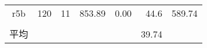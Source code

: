 \begin{table}[]
\begin{tabular}{cccrrrr}
r5b                  & 120                  & 11                   & 853.89                  & 0.00                       & 44.6                        & 589.74                      \\
\multicolumn{1}{l}{} & \multicolumn{1}{l}{} & \multicolumn{1}{l}{} & \multicolumn{1}{l}{}    & \multicolumn{1}{l}{}       & \multicolumn{1}{l}{}        & \multicolumn{1}{l}{}        \\
平均                   & \multicolumn{1}{l}{} & \multicolumn{1}{l}{} & \multicolumn{1}{l}{}    & \multicolumn{1}{l}{}       & 39.74                       & \multicolumn{1}{l}{}        \\ \hline
\end{tabular}
\end{table}


